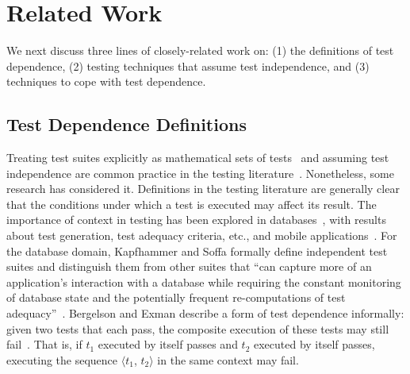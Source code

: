\section{Related Work}

We next discuss three lines of closely-related work on: (1)
the definitions of test dependence, (2)
testing techniques that assume test independence,
and (3) techniques to cope with test dependence.

\subsection{Test Dependence Definitions}

Treating test suites explicitly as
mathematical sets of tests~\cite{howden:ToC:1975}
and assuming test independence are common practice
in the testing literature~\cite{harroldetal:OOPSLA:2001, Orso:2004:SRT,
Briand:2009:ART, Zhang:2012:RMT, Nanda:2011:RTP,
Elbaum:2000:PTC:347324.348910, Kim:2002:HTP:581339.581357, Rummel:2005:TPR:1066677.1067016, Srivastava:2002:EPT:566172.566187, Jiang:2009:ART,
Steimann:2013, Zhang:2013:IMF, Jones:2002:VTI}.
%
%
Nonetheless, some research has considered it.
Definitions in the testing literature are generally clear that
the conditions under which a test is executed may affect
its result. The importance of context in testing has been explored
in databases~\cite{Gray:1994:QGB:191843.191886,Chays:2000:FTD:347324.348954, kapfhammeretal:FSE:2003}, with results about test generation,
test adequacy criteria, etc., and mobile applications~\cite{Wang:2007:AGC}. For
the database domain, Kapfhammer and Soffa formally define
independent test suites and distinguish them from other
suites that ``can capture more of an application's interaction
with a database while requiring the constant monitoring of
database state and the potentially frequent re-computations
of test adequacy''~\cite{kapfhammeretal:FSE:2003}. 
%
%
Bergelson and Exman describe a form of test dependence
informally: given two tests that each pass, the
composite execution of these tests may still fail~\cite{bergelsonetal:EEE:2006}.
That is, if \textit{$t_1$} executed by itself passes and
\textit{$t_2$} executed by itself passes,
executing the sequence $\langle$\textit{$t_1$}, \textit{$t_2$}$\rangle$ in
the same context may fail.


